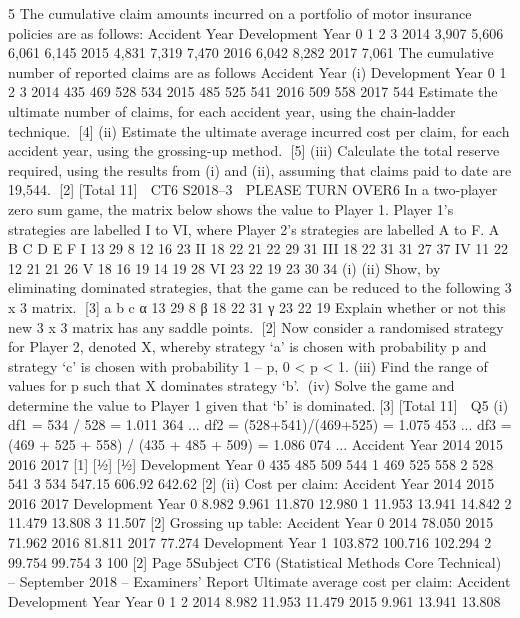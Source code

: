 \documentclass[a4paper,12pt]{article}
\begin{document}
\begin{enumerate}
5
The cumulative claim amounts incurred on a portfolio of motor insurance policies are
as follows:
Accident Year
Development Year
0 1 2 3
2014 3,907 5,606 6,061 6,145
2015 4,831 7,319 7,470 2016 6,042 8,282 2017 7,061
The cumulative number of reported claims are as follows
Accident Year
(i)
Development Year
0 1 2 3
2014 435 469 528 534
2015 485 525 541 2016 509 558 2017 544
Estimate the ultimate number of claims, for each accident year, using the
chain-ladder technique.
[4]
(ii) Estimate the ultimate average incurred cost per claim, for each accident year,
using the grossing-up method.
[5]
(iii) Calculate the total reserve required, using the results from (i) and (ii),
assuming that claims paid to date are 19,544.
[2]
[Total 11]

CT6 S2018–3 
PLEASE TURN OVER6
In a two-player zero sum game, the matrix below shows the value to Player 1. Player
1’s strategies are labelled I to VI, where Player 2’s strategies are labelled A to F.
A B C D E F
I 13 29 8 12 16 23
II 18 22 21 22 29 31
III 18 22 31 31 27 37
IV 11 22 12 21 21 26
V 18 16 19 14 19 28
VI 23 22 19 23 30 34
(i)
(ii)
Show, by eliminating dominated strategies, that the game can be reduced to the
following 3 x 3 matrix.
[3]
a b c
α 13 29 8
β 18 22 31
γ 23 22 19
Explain whether or not this new 3 x 3 matrix has any saddle points.
[2]
Now consider a randomised strategy for Player 2, denoted X, whereby strategy ‘a’ is
chosen with probability p and strategy ‘c’ is chosen with probability 1 – p, 0 < p < 1.
(iii) Find the range of values for p such that X dominates strategy ‘b’.
(iv) Solve the game and determine the value to Player 1 given that ‘b’ is
dominated.[3]
[Total 11]

Q5
(i)
df1 = 534 / 528 = 1.011 364 ...
df2 = (528+541)/(469+525) = 1.075 453 ...
df3 = (469 + 525 + 558) / (435 + 485 + 509) = 1.086 074 ...
Accident
Year
2014
2015
2016
2017
[1]
[1⁄2]
[1⁄2]
Development Year
0
435
485
509
544
1
469
525
558
2
528
541
3
534
547.15
606.92
642.62
[2]
(ii)
Cost per claim:
Accident
Year
2014
2015
2016
2017
Development Year
0
8.982
9.961
11.870
12.980
1
11.953
13.941
14.842
2
11.479
13.808
3
11.507
[2]
Grossing up table:
Accident
Year
0
2014
78.050%
2015
71.962%
2016
81.811%
2017
77.274%
Development Year
1
103.872%
100.716%
102.294%
2
99.754%
99.754%
3
100%
[2]
Page 5Subject CT6 (Statistical Methods Core Technical) – September 2018 – Examiners’ Report
Ultimate average cost per claim:
Accident
Development Year
Year
0
1
2
2014
8.982
11.953
11.479
2015
9.961
13.941
13.808

\end{enumerate}
\end{document}
